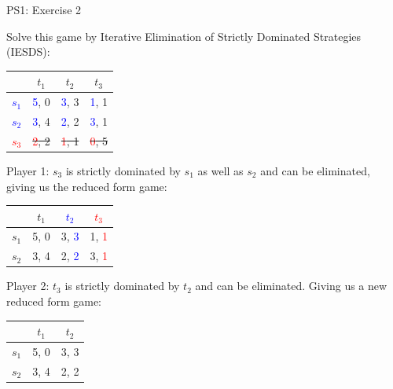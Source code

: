 \begin{frame}{PS1: Exercise 2}
\begin{multicols}{2}
Solve this game by Iterative Elimination of Strictly Dominated Strategies (IESDS):
\begin{table}
  \begin{tabular}{c|c|c|c}
          & $t_1$ & $t_2$ & $t_3$ \\
    \midrule
    \textcolor{blue}{$s_1$} & \textcolor{blue}{5}, 0  & \textcolor{blue}{3}, 3  & \textcolor{blue}{1}, 1 \\
    \midrule
    \textcolor{blue}{$s_2$} & \textcolor{blue}{3}, 4  & \textcolor{blue}{2}, 2  & \textcolor{blue}{3}, 1 \\
    \midrule
    \sout{\textcolor{red}{$s_3$}} & \sout{\textcolor{red}{2}, 2}  & \sout{\textcolor{red}{1}, 1}  & \sout{\textcolor{red}{0}, 5}
  \end{tabular}
\end{table}
Player 1: $s_3$ is strictly dominated by $s_1$ as well as $s_2$ and can be eliminated, giving us the reduced form game:
\begin{table}
  \begin{tabular}{c|c|c|c}
          & $t_1$ & \textcolor{blue}{$t_2$} & \textcolor{red}{$t_3$} \\
    \midrule
    $s_1$ & 5, 0  & 3, \textcolor{blue}{3}  & 1, \textcolor{red}{1} \\
    \midrule
    $s_2$ & 3, 4  & 2, \textcolor{blue}{2}  & 3, \textcolor{red}{1}
  \end{tabular}
\end{table}
Player 2: $t_3$ is strictly dominated by $t_2$ and can be eliminated.
\vfill\null
\columnbreak
Giving us a new reduced form game:
\begin{table}
  \begin{tabular}{c|c|c}
          & $t_1$ & $t_2$ \\
    \midrule
    $s_1$ & 5, 0  & 3, 3  \\
    \midrule
    $s_2$ & 3, 4  & 2, 2
  \end{tabular}
\end{table}
\vfill\null
\end{multicols}
\end{frame}

